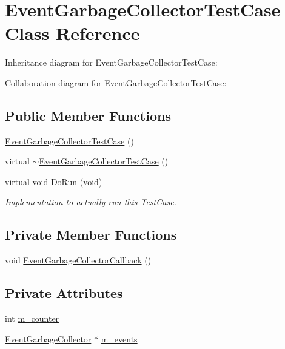 \hypertarget{classEventGarbageCollectorTestCase}{}\section{Event\+Garbage\+Collector\+Test\+Case Class Reference}
\label{classEventGarbageCollectorTestCase}


Inheritance diagram for Event\+Garbage\+Collector\+Test\+Case\+:


Collaboration diagram for Event\+Garbage\+Collector\+Test\+Case\+:
\subsection*{Public Member Functions}
\begin{DoxyCompactItemize}
\item 
\hyperlink{classEventGarbageCollectorTestCase_a44476e6f94f600cada2ae5fddb388904}{Event\+Garbage\+Collector\+Test\+Case} ()
\item 
virtual \hyperlink{classEventGarbageCollectorTestCase_ad157bc1b2590ba601276ebdc296dcc5e}{$\sim$\+Event\+Garbage\+Collector\+Test\+Case} ()
\item 
virtual void \hyperlink{classEventGarbageCollectorTestCase_aed57907310e334eafaad671d24f1f468}{Do\+Run} (void)
\begin{DoxyCompactList}\small\item\em Implementation to actually run this Test\+Case. \end{DoxyCompactList}\end{DoxyCompactItemize}
\subsection*{Private Member Functions}
\begin{DoxyCompactItemize}
\item 
void \hyperlink{classEventGarbageCollectorTestCase_ae256e5e1a16bc68c93027b2d1f9b92fb}{Event\+Garbage\+Collector\+Callback} ()
\end{DoxyCompactItemize}
\subsection*{Private Attributes}
\begin{DoxyCompactItemize}
\item 
int \hyperlink{classEventGarbageCollectorTestCase_ae7605a6d3efa06cdf6f6754527e99145}{m\+\_\+counter}
\item 
\hyperlink{classns3_1_1EventGarbageCollector}{Event\+Garbage\+Collector} $\ast$ \hyperlink{classEventGarbageCollectorTestCase_a6b405f7fe2a4cb6d3a7a37807bf9af76}{m\+\_\+events}
\end{DoxyCompactItemize}
